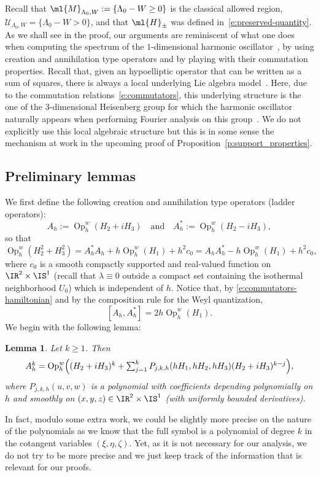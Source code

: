\documentclass[10pt]{amsart}
\theoremstyle{plain}
\newtheorem{lemm}[theo]{Lemma}
\theoremstyle{definition}
\theoremstyle{remark}
\newcommand{\Op}{\operatorname{Op}}
\begin{document}
Recall that $\ml{M}_{\Lambda_0,W}:=\{\Lambda_0-W\geq 0\}$ is the classical allowed region, $\mathcal{U}_{\Lambda_0,W} = \{ \Lambda_0 - W > 0 \}$, and that $\ml{H}_{\pm}$ was defined in~\eqref{e:preserved-quantity}. As we shall see in the proof, our arguments are reminiscent of what one does when computing the spectrum of the $1$\nobreakdash-dimensional harmonic oscillator~\cite[Ch.\,6]{Zworski12}, \ie by using creation and annihilation type operators and by playing with their commutation properties. Recall that, given an hypoelliptic operator that can be written as a sum of squares, there is \hbox{always} a local underlying Lie algebra model~\cite{RothschildStein76}. Here, due to the commutation rela\-tions~\eqref{e:commutators}, this underlying structure is the one of the $3$-dimensional Heisenberg group for which the harmonic oscillator naturally appears when performing Fourier analysis on this group~\cite{FermanianFischer21}. We do not explicitly use this local algebraic structure but this is in some sense the mechanism at work in the upcoming proof of Proposition~\ref{p:support_properties}.

\subsection{Preliminary lemmas}
\label{s:preliminary_section}

We first define the following creation and annihilation type operators (ladder operators):
\[
A_h:=\Op_h^w(H_2+iH_3)\quad\text{and}\quad A_h^*:=\Op_h^w(H_2-iH_3),
\]
so that
\begin{equation}\label{e:AAstar}
\Op_h^w(H_2^2+H_3^2)=A_h^*A_h+h\Op_h^w(H_1)+h^2c_0=A_hA_h^*-h\Op_h^w(H_1)+h^2c_0,
\end{equation}
where $c_0$ is a smooth compactly supported and real-valued function on $\IR^2\times\IS^1$ (recall that $\lambda\equiv 0$ outside a compact set containing the isothermal neighborhood $U_0$) which is independent of $h$. Notice that, by \eqref{e:commutators-hamiltonian} and by the composition rule for the Weyl quantization,
\begin{equation}
\label{e:commutator_A_A*}
[A_h, A_h^*] = 2h \Op_h^w(H_1).
\end{equation}
We begin with the following lemma:

\begin{lemm}\label{l:A:power-k} Let $k\geq 1$. Then
\[\textstyle
A_h^k=\Op_h^w\Bigl((H_2+iH_3)^k+\sum_{j=1}^{k}P_{j,k,h}(hH_1,hH_2,hH_3)(H_2+iH_3)^{k-j}\Bigr),
\]
where $P_{j,k,h}(u,v,w)$ is a polynomial with coefficients depending polynomially on $h$ and smoothly on $(x,y,z)\in\IR^2\times\IS^1$ (with uniformly bounded derivatives).
\end{lemm}
In fact, modulo some extra work, we could be slightly more precise on the nature of the polynomials as we know that the full symbol is a polynomial of degree $k$ in the cotangent variables $(\xi,\eta,\zeta)$. Yet, as it is not necessary for our analysis, we do not try to be more precise and we just keep track of the information that is relevant for our proofs.
\end{document}
